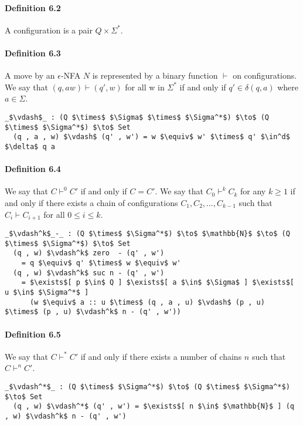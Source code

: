 \paragraph{Definition 6.2} A configuration is a pair \(Q \times
\Sigma^*\). 

\paragraph{Definition 6.3} A move by an \(\epsilon\)-NFA \(N\) is
represented by a binary function \(\vdash\) on configurations. We say
that \((q, aw) \vdash (q' , w)\) for all w in \(\Sigma^*\)
if and only if \(q' \in \delta (q , a)\) where \(a \in \Sigma\). 

\begin{lstlisting}[mathescape=true]
  _$\vdash$_ : (Q $\times$ $\Sigma$ $\times$ $\Sigma^*$) $\to$ (Q $\times$ $\Sigma^*$) $\to$ Set
  (q , a , w) $\vdash$ (q' , w') = w $\equiv$ w' $\times$ q' $\in^d$ $\delta$ q a
\end{lstlisting}

\paragraph{Definition 6.4} We say that \(C \vdash^0 C'\) if and only
if \(C = C'\). We say that \(C_0 \vdash^k C_k\) for any \(k \geq 1\) if and only if there exists a chain of
configurations \(C_1, C_2, ..., C_{k-1}\) such that \(C_i \vdash
C_{i+1}\) for all \(0 \leq i \leq k\). 

\begin{lstlisting}[mathescape=true]
  _$\vdash^k$_-_ : (Q $\times$ $\Sigma^*$) $\to$ $\mathbb{N}$ $\to$ (Q $\times$ $\Sigma^*$) $\to$ Set
  (q , w) $\vdash^k$ zero  - (q' , w')
    = q $\equiv$ q' $\times$ w $\equiv$ w'
  (q , w) $\vdash^k$ suc n - (q' , w') 
    = $\exists$[ p $\in$ Q ] $\exists$[ a $\in$ $\Sigma$ ] $\exists$[ u $\in$ $\Sigma^*$ ]
      (w $\equiv$ a :: u $\times$ (q , a , u) $\vdash$ (p , u) $\times$ (p , u) $\vdash^k$ n - (q' , w'))
\end{lstlisting}

\paragraph{Definition 6.5} We say that \(C \vdash^* C'\) if and only
if there exists a number of chains \(n\) such that \(C \vdash^n C'\). 

\begin{lstlisting}[mathescape=true]
  _$\vdash^*$_ : (Q $\times$ $\Sigma^*$) $\to$ (Q $\times$ $\Sigma^*$) $\to$ Set
  (q , w) $\vdash^*$ (q' , w') = $\exists$[ n $\in$ $\mathbb{N}$ ] (q , w) $\vdash^k$ n - (q' , w')
\end{lstlisting}


